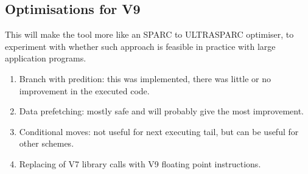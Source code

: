 \subsection{Optimisations for V9}
This will make the tool more like an SPARC to ULTRASPARC optimiser, 
to experiment with whether such approach is feasible in practice 
with large application programs.

\begin{enumerate}
\item Branch with predition: this was implemented, there was little or 
	no improvement in the executed code.
\item Data prefetching: mostly safe and will probably give the most improvement.
\item Conditional moves: not useful for next executing tail, but can be 
	useful for other schemes.
\item Replacing of V7 library calls with V9 floating point instructions.
\end{enumerate}


